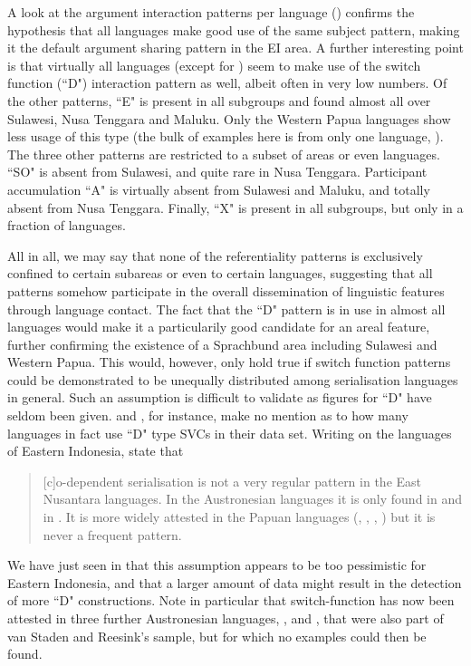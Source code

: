 A look at the argument interaction patterns per language () confirms the hypothesis that all languages make good use of the same subject pattern, making it the default argument sharing pattern in the EI area. A further interesting point is that virtually all languages (except for ) seem to make use of the switch function (``D") interaction pattern as well, albeit often in very low numbers. Of the other patterns, ``E" is present in all subgroups and found almost all over Sulawesi, Nusa Tenggara and Maluku. Only the Western Papua languages show less usage of this type (the bulk of examples here is from only one language, ). The three other patterns are restricted to a subset of areas or even languages. ``SO" is absent from Sulawesi, and quite rare in Nusa Tenggara. Participant accumulation ``A" is virtually absent from Sulawesi and Maluku, and totally absent from Nusa Tenggara. Finally, ``X" is present in all subgroups, but only in a fraction of languages.

All in all, we may say that none of the referentiality patterns is exclusively confined to certain subareas or even to certain languages, suggesting that all patterns somehow participate in the overall dissemination of linguistic features through language contact. The fact that the ``D" pattern is in use in almost all languages would make it a particularily good candidate for an areal feature, further confirming the existence of a Sprachbund area including Sulawesi and Western Papua. This would, however, only hold true if switch function patterns could be demonstrated to be unequally distributed among serialisation languages in general. Such an assumption is difficult to validate as figures for ``D" have seldom been given. \textcite{Aikhenvald2006} and \textcite{Durie1997}, for instance, make no mention as to how many languages in fact use ``D" type SVCs in their data set. Writing on the languages of Eastern Indonesia, \citet[26]{vanstaden2008serial} state that \begin{quote}[c]o-dependent serialisation is not a very regular pattern in the East Nusantara languages. In the Austronesian languages it is only found in  and in . It is more widely attested in the Papuan languages (, , , ) but it is never a frequent pattern.\end{quote}
We have just seen in  that this assumption appears to be too pessimistic for Eastern Indonesia, and that a larger amount of data might result in the detection of more ``D" constructions. Note in particular that switch-function has now been attested in three further Austronesian languages, ,  and , that were also part of van Staden and Reesink's sample, but for which no examples could then be found.

